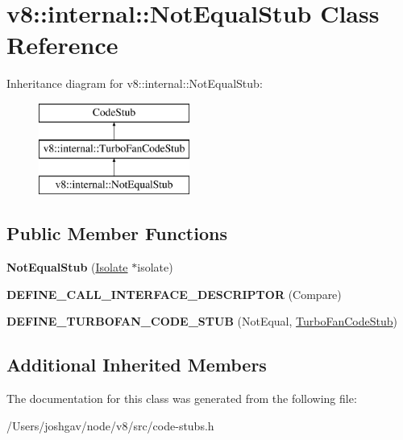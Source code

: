 \hypertarget{classv8_1_1internal_1_1_not_equal_stub}{}\section{v8\+:\+:internal\+:\+:Not\+Equal\+Stub Class Reference}
\label{classv8_1_1internal_1_1_not_equal_stub}
Inheritance diagram for v8\+:\+:internal\+:\+:Not\+Equal\+Stub\+:\begin{figure}[H]
\begin{center}
\leavevmode
\includegraphics[height=3.000000cm]{classv8_1_1internal_1_1_not_equal_stub}
\end{center}
\end{figure}
\subsection*{Public Member Functions}
\begin{DoxyCompactItemize}
\item 
{\bfseries Not\+Equal\+Stub} (\hyperlink{classv8_1_1internal_1_1_isolate}{Isolate} $\ast$isolate)\hypertarget{classv8_1_1internal_1_1_not_equal_stub_a5631b1c546f8ba7b62e50d0f73e4f4fc}{}\label{classv8_1_1internal_1_1_not_equal_stub_a5631b1c546f8ba7b62e50d0f73e4f4fc}

\item 
{\bfseries D\+E\+F\+I\+N\+E\+\_\+\+C\+A\+L\+L\+\_\+\+I\+N\+T\+E\+R\+F\+A\+C\+E\+\_\+\+D\+E\+S\+C\+R\+I\+P\+T\+OR} (Compare)\hypertarget{classv8_1_1internal_1_1_not_equal_stub_a8e29a86909c2003143cfe4ebeaea3617}{}\label{classv8_1_1internal_1_1_not_equal_stub_a8e29a86909c2003143cfe4ebeaea3617}

\item 
{\bfseries D\+E\+F\+I\+N\+E\+\_\+\+T\+U\+R\+B\+O\+F\+A\+N\+\_\+\+C\+O\+D\+E\+\_\+\+S\+T\+UB} (Not\+Equal, \hyperlink{classv8_1_1internal_1_1_turbo_fan_code_stub}{Turbo\+Fan\+Code\+Stub})\hypertarget{classv8_1_1internal_1_1_not_equal_stub_a4adff5c481a82dc542d81f6702754d44}{}\label{classv8_1_1internal_1_1_not_equal_stub_a4adff5c481a82dc542d81f6702754d44}

\end{DoxyCompactItemize}
\subsection*{Additional Inherited Members}


The documentation for this class was generated from the following file\+:\begin{DoxyCompactItemize}
\item 
/\+Users/joshgav/node/v8/src/code-\/stubs.\+h\end{DoxyCompactItemize}
